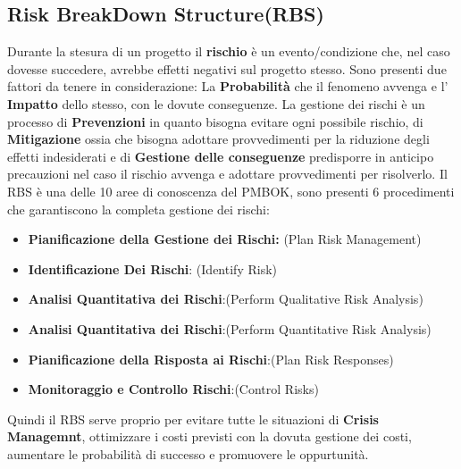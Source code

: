 \documentclass{report}
\begin{document}
\subsection{Risk BreakDown Structure(RBS)}
Durante la stesura di un progetto il \textbf{rischio} è un evento/condizione che, nel caso dovesse succedere, avrebbe effetti negativi sul progetto stesso.
Sono presenti due fattori da tenere in considerazione: La \textbf{Probabilità} che il fenomeno avvenga e l' \textbf{Impatto} dello stesso, con le dovute conseguenze.
La gestione dei rischi è un processo di \textbf{Prevenzioni} in quanto bisogna evitare ogni possibile rischio, di \textbf{Mitigazione} ossia che bisogna adottare provvedimenti per la riduzione degli effetti indesiderati e di \textbf{Gestione delle conseguenze} predisporre in anticipo precauzioni nel caso il rischio avvenga e adottare provvedimenti per risolverlo.
Il RBS è una delle 10 aree di conoscenza del PMBOK, sono presenti 6 procedimenti che garantiscono la completa gestione dei rischi:
\begin{itemize}

 \item \textbf{Pianificazione della Gestione dei Rischi:} (Plan Risk Management)
 
 \item \textbf{Identificazione Dei Rischi}: (Identify Risk)
 
 \item \textbf{Analisi Quantitativa dei Rischi}:(Perform Qualitative Risk Analysis)
 
 \item \textbf{Analisi Quantitativa dei Rischi}:(Perform Quantitative Risk Analysis)
 
 \item \textbf{Pianificazione della Risposta ai Rischi}:(Plan Risk Responses)
 
 \item \textbf{Monitoraggio e Controllo Rischi}:(Control Risks)
\end{itemize}

Quindi il RBS serve proprio per evitare tutte le situazioni di \textbf{Crisis Managemnt}, ottimizzare i costi previsti con la dovuta gestione dei costi, aumentare le probabilità di successo e promuovere le oppurtunità.
\end{document}
